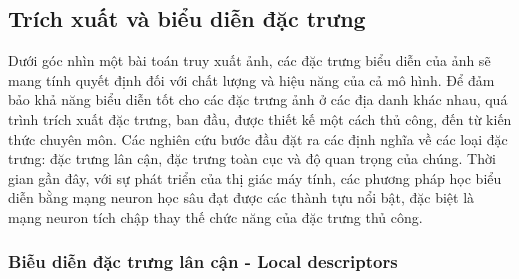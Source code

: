 \subsection{Trích xuất và biểu diễn đặc trưng}

Dưới góc nhìn một bài toán truy xuất ảnh, các đặc trưng biểu diễn của ảnh sẽ mang tính quyết định đối với chất lượng và hiệu năng của cả mô hình. Để đảm bảo khả năng biểu diễn tốt cho các đặc trưng ảnh ở các địa danh khác nhau, quá trình trích xuất đặc trưng, ban đầu, được thiết kế một cách thủ công, đến từ kiến thức chuyên môn. Các nghiên cứu bước đầu đặt ra các định nghĩa về các loại đặc trưng: đặc trưng lân cận, đặc trưng toàn cục và độ quan trọng của chúng. Thời gian gần đây, với sự phát triển của thị giác máy tính, các phương pháp học biểu diễn bằng mạng neuron học sâu đạt được các thành tựu nổi bật, đặc biệt là mạng neuron tích chập thay thế chức năng của đặc trưng thủ công.

\subsubsection{Biễu diễn đặc trưng lân cận - Local descriptors}

